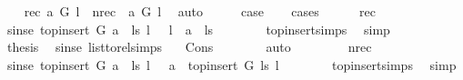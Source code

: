 \begin{isabellebody}
\ \ \isamarkupfalse%
\ {\isacharparenleft}{\kern0pt}rec{\isacharparenright}{\kern0pt}\ {\isachardoublequoteopen}a\ {\isasymrightarrow}\isactrlsup {\isacharplus}{\kern0pt}\isactrlbsub G\isactrlesub \ l{\isachardoublequoteclose}\ {\isacharbar}{\kern0pt}\ {\isacharparenleft}{\kern0pt}nrec{\isacharparenright}{\kern0pt}\ {\isachardoublequoteopen}{\isasymnot}\ a\ {\isasymrightarrow}\isactrlsup {\isacharplus}{\kern0pt}\isactrlbsub G\isactrlesub \ l{\isachardoublequoteclose}\ \isamarkupfalse%
\ auto\isanewline
\ \ \isamarkupfalse%
\ \isamarkupfalse%
\ {\isacharquery}{\kern0pt}case\ \isanewline
\ \ \isamarkupfalse%
{\isacharparenleft}{\kern0pt}cases{\isacharparenright}{\kern0pt}\isanewline
\ \ \ \ \isamarkupfalse%
\ rec\isanewline
\ \ \ \ \isamarkupfalse%
\ \isamarkupfalse%
\ sinse{\isacharcolon}{\kern0pt}\ {\isachardoublequoteopen}{\isacharparenleft}{\kern0pt}top{\isacharunderscore}{\kern0pt}insert\ G\ {\isacharparenleft}{\kern0pt}a\ {\isacharhash}{\kern0pt}\ ls{\isacharparenright}{\kern0pt}\ l{\isacharparenright}{\kern0pt}\ \ {\isacharequal}{\kern0pt}\ l\ {\isacharhash}{\kern0pt}\ a\ {\isacharhash}{\kern0pt}\ ls{\isachardoublequoteclose}\isanewline
\ \ \ \ \ \ \isamarkupfalse%
\ top{\isacharunderscore}{\kern0pt}insert{\isachardot}{\kern0pt}simps\ \isamarkupfalse%
\ simp\isanewline
\ \ \ \ \isamarkupfalse%
\ {\isacharquery}{\kern0pt}thesis\ \isamarkupfalse%
\ sinse\ list{\isacharunderscore}{\kern0pt}to{\isacharunderscore}{\kern0pt}rel{\isachardot}{\kern0pt}simps\ \ \isamarkupfalse%
\ Cons\isanewline
\ \ \ \ \ \ \isamarkupfalse%
\ auto\isanewline
\ \ \isamarkupfalse%
\isanewline
\ \ \ \ \isamarkupfalse%
\ nrec\isanewline
\ \ \ \ \isamarkupfalse%
\ \isamarkupfalse%
\ sinse{\isacharcolon}{\kern0pt}\ {\isachardoublequoteopen}{\isacharparenleft}{\kern0pt}top{\isacharunderscore}{\kern0pt}insert\ G\ {\isacharparenleft}{\kern0pt}a\ {\isacharhash}{\kern0pt}\ ls{\isacharparenright}{\kern0pt}\ l{\isacharparenright}{\kern0pt}\ \ {\isacharequal}{\kern0pt}\ a\ {\isacharhash}{\kern0pt}\ top{\isacharunderscore}{\kern0pt}insert\ G\ ls\ l{\isachardoublequoteclose}\isanewline
\ \ \ \ \ \ \isamarkupfalse%
\ top{\isacharunderscore}{\kern0pt}insert{\isachardot}{\kern0pt}simps\ \isamarkupfalse%
\ simp\isanewline
\ \ \ \ \isamarkupfalse%

\end{isabellebody}
